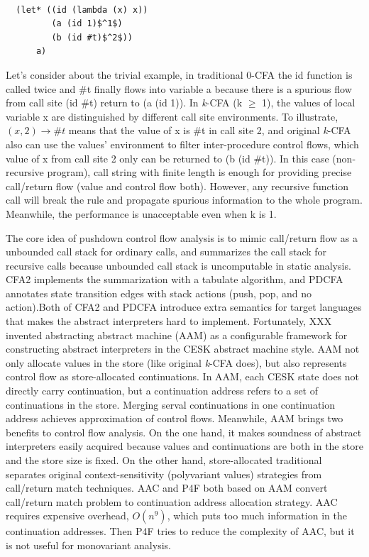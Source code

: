 \documentclass{article}
\begin{document}
\lstset{language=Lisp, mathescape}
\begin{lstlisting}

  (let* ((id (lambda (x) x))
         (a (id 1)$^1$)
         (b (id #t)$^2$))
      a)

\end{lstlisting}


Let's consider about the trivial example, in traditional 0-CFA the id function is called twice and \#t finally flows into variable a because there is a spurious flow from call site (id \#t) return to (a (id 1)). In \textit{k}-CFA (k $\geq$ 1), the values of local variable x are distinguished by different call site environments. To illustrate, $(x, 2) \longrightarrow \#t$ means that the value of x is \#t in call site 2, and original \textit{k}-CFA also can use the values' environment to filter inter-procedure control flows, which value of x from call site 2 only can be returned to (b (id \#t)). In this case (non-recursive program), call string with finite length is enough for providing precise call/return flow (value and control flow both). However, any recursive function call will break the rule and propagate spurious information to the whole program. Meanwhile, the performance is unacceptable even when k is 1.

The core idea of pushdown control flow analysis is to mimic call/return flow as a unbounded call stack for ordinary calls, and summarizes the call stack for recursive calls because unbounded call stack is uncomputable in static analysis. CFA2 implements the summarization with a tabulate algorithm, and PDCFA annotates state transition edges with stack actions (push, pop, and no action).Both of CFA2 and PDCFA introduce extra semantics for target languages that makes the abstract interpreters hard to implement.
Fortunately, XXX invented abstracting abstract machine (AAM) as a configurable framework for constructing abstract interpreters in the CESK abstract machine style. AAM not only allocate values in the store (like original \textit{k}-CFA does), but also represents control flow as store-allocated continuations. In AAM, each CESK state does not directly carry continuation, but a continuation address refers to a set of continuations in the store. Merging serval continuations in one continuation address achieves approximation of control flows. Meanwhile, AAM brings two benefits to control flow analysis. On the one hand, it makes soundness of abstract interpreters easily acquired because values and continuations are both in the store and the store size is fixed. On the other hand, store-allocated traditional separates original context-sensitivity (polyvariant values) strategies from call/return match techniques.
AAC and P4F both based on AAM convert call/return match problem to continuation address allocation strategy. AAC requires expensive overhead, $O(n^9)$, which puts too much information in the continuation addresses. Then P4F tries to reduce the complexity of AAC, but it is not useful for monovariant analysis.
\end{document}
